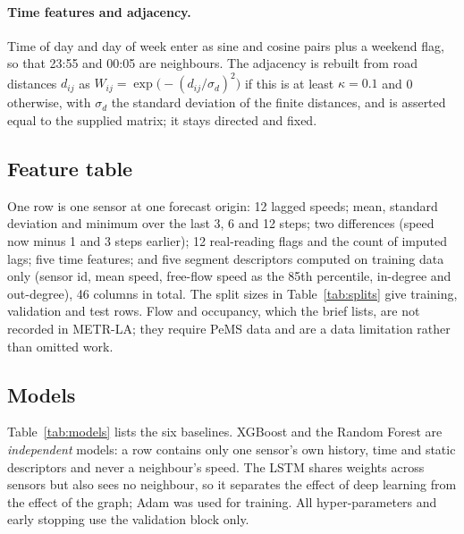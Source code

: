 \documentclass[11pt,a4paper]{article}
\begin{document}
\paragraph{Time features and adjacency.}
Time of day and day of week enter as sine and cosine pairs plus a weekend flag, so that 23:55 and 00:05 are neighbours.
The adjacency is rebuilt from road distances $d_{ij}$ as $W_{ij}=\exp\!\big(-(d_{ij}/\sigma_d)^2\big)$ if this is at least $\kappa=0.1$ and 0 otherwise, with $\sigma_d$ the standard deviation of the finite distances, and is asserted equal to the supplied matrix; it stays directed and fixed.

\subsection{Feature table}
One row is one sensor at one forecast origin: 12 lagged speeds; mean, standard deviation and minimum over the last 3, 6 and 12 steps; two differences (speed now minus 1 and 3 steps earlier); 12 real-reading flags and the count of imputed lags; five time features; and five segment descriptors computed on training data only (sensor id, mean speed, free-flow speed as the 85th percentile, in-degree and out-degree), 46 columns in total.
The split sizes in Table~\ref{tab:splits} give \RowsTrain{} training, \RowsVal{} validation and \RowsTest{} test rows.
Flow and occupancy, which the brief lists, are not recorded in METR-LA; they require PeMS data and are a data limitation rather than omitted work.

\subsection{Models}
Table~\ref{tab:models} lists the six baselines.
XGBoost and the Random Forest are \emph{independent} models: a row contains only one sensor's own history, time and static descriptors and never a neighbour's speed.
The LSTM shares weights across sensors but also sees no neighbour, so it separates the effect of deep learning from the effect of the graph; Adam \citep{kingma2015adam} was used for training.
All hyper-parameters and early stopping use the validation block only.
\begin{table}[ht]
\centering\small

\caption{The six baselines and their configuration.}
\label{tab:models}
\end{table}
\end{document}
